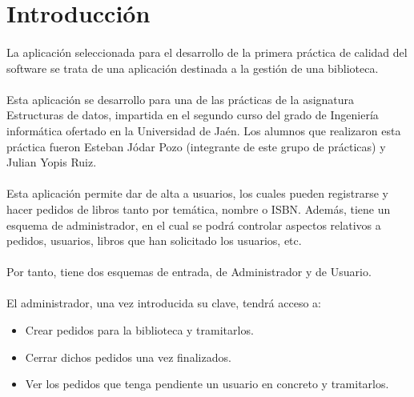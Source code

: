 \section{Introducción}

	\paragraph{}La aplicación seleccionada para el desarrollo de la primera práctica de calidad del software se trata de una aplicación destinada a la gestión de una biblioteca.
	
	\paragraph{}Esta aplicación se desarrollo para una de las prácticas de la asignatura Estructuras de datos, impartida en el segundo curso del grado de Ingeniería informática ofertado en la Universidad de Jaén. Los alumnos que realizaron esta práctica fueron Esteban Jódar Pozo (integrante de este grupo de prácticas) y Julian Yopis Ruiz.
	
	\paragraph{}Esta aplicación permite dar de alta a usuarios, los cuales pueden registrarse y hacer pedidos de libros tanto por temática, nombre o ISBN. Además, tiene un esquema de administrador, en el cual se podrá controlar aspectos relativos a pedidos, usuarios, libros que han solicitado los usuarios, etc.
	
	\paragraph{}Por tanto, tiene dos esquemas de entrada, de Administrador y de Usuario.
	
	\paragraph{}El administrador, una vez introducida su clave, tendrá acceso a:
	
	\begin{itemize}
		\item Crear pedidos para la biblioteca y tramitarlos.
		\item Cerrar dichos pedidos una vez finalizados.
		\item Ver los pedidos que tenga pendiente un usuario en concreto y tramitarlos.
	\end{itemize}

